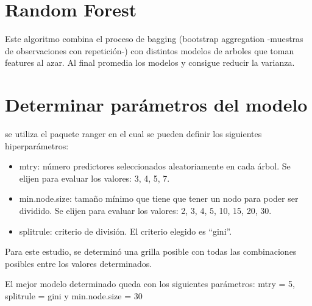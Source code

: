 \documentclass[]{article}
\providecommand{\tightlist}{%
  \setlength{\itemsep}{0pt}\setlength{\parskip}{0pt}}
\begin{document}
\hypertarget{random-forest}{%
\section{Random Forest}\label{random-forest}}

Este algoritmo combina el proceso de bagging (bootstrap aggregation
-muestras de observaciones con repetición-) con distintos modelos de
arboles que toman features al azar. Al final promedia los modelos y
consigue reducir la varianza.

\hypertarget{determinar-paruxe1metros-del-modelo-1}{%
\section{Determinar parámetros del
modelo}\label{determinar-paruxe1metros-del-modelo-1}}

se utiliza el paquete ranger en el cual se pueden definir los siguientes
hiperparámetros:

\begin{itemize}
\tightlist
\item
  mtry: número predictores seleccionados aleatoriamente en cada árbol.
  Se elijen para evaluar los valores: 3, 4, 5, 7.
\item
  min.node.size: tamaño mínimo que tiene que tener un nodo para poder
  ser dividido. Se elijen para evaluar los valores: 2, 3, 4, 5, 10, 15,
  20, 30.
\item
  splitrule: criterio de división. El criterio elegido es ``gini''.
\end{itemize}

Para este estudio, se determinó una grilla posible con todas las
combinaciones posibles entre los valores determinados.

El mejor modelo determinado queda con los siguientes parámetros: mtry =
5, splitrule = gini y min.node.size = 30
\end{document}
